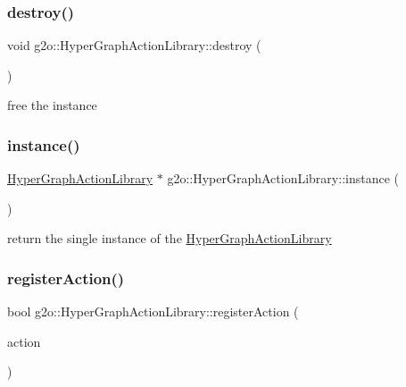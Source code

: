 \subsubsection{\texorpdfstring{destroy()}{destroy()}}
{\footnotesize\ttfamily void g2o\+::\+Hyper\+Graph\+Action\+Library\+::destroy (\begin{DoxyParamCaption}{ }\end{DoxyParamCaption})\hspace{0.3cm}{\ttfamily [static]}}



free the instance 

\mbox{\label{classg2o_1_1_hyper_graph_action_library_a12074e3f4d9bcb3da20a4fe23d18b745}} 
\subsubsection{\texorpdfstring{instance()}{instance()}}
{\footnotesize\ttfamily \mbox{\hyperlink{classg2o_1_1_hyper_graph_action_library}{Hyper\+Graph\+Action\+Library}} $\ast$ g2o\+::\+Hyper\+Graph\+Action\+Library\+::instance (\begin{DoxyParamCaption}{ }\end{DoxyParamCaption})\hspace{0.3cm}{\ttfamily [static]}}



return the single instance of the \mbox{\hyperlink{classg2o_1_1_hyper_graph_action_library}{Hyper\+Graph\+Action\+Library}} 

\mbox{\label{classg2o_1_1_hyper_graph_action_library_a8ff09559af9efdf636ad14a011ef73ae}} 
\subsubsection{\texorpdfstring{register\+Action()}{registerAction()}}
{\footnotesize\ttfamily bool g2o\+::\+Hyper\+Graph\+Action\+Library\+::register\+Action (\begin{DoxyParamCaption}\item[{\mbox{\hyperlink{classg2o_1_1_hyper_graph_element_action}{Hyper\+Graph\+Element\+Action}} $\ast$}]{action }\end{DoxyParamCaption})}

